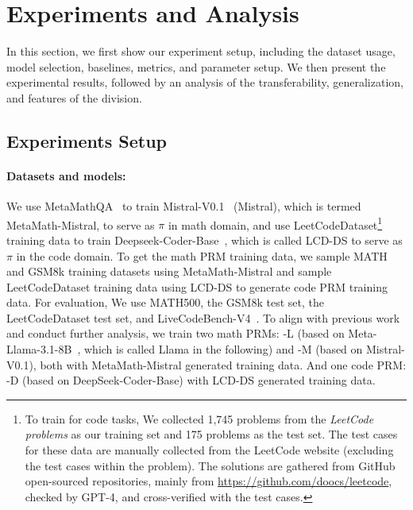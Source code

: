 
\section{Experiments and Analysis}



In this section, we first show our experiment setup, including the dataset usage, model selection, baselines, metrics, and parameter setup.  We then present the experimental results, followed by an analysis of the transferability, generalization, and features of the division.

\subsection{Experiments Setup}

\paragraph{Datasets and models:} We use MetaMathQA~\cite{yu2023metamath} to train Mistral-V0.1~\cite{jiang2023mistral7b} (Mistral), which is termed MetaMath-Mistral, to serve as $\pi$ in math domain, and use LeetCodeDataset\footnote{To train \MethodName \hspace{1pt} for code tasks, We collected 1,745 problems from the \textit{LeetCode problems} as our training set and 175 problems as the test set. The test cases for these data are manually collected from the LeetCode website (excluding the test cases within the problem). 
The solutions are gathered from GitHub open-sourced repositories, mainly from \href{https://github.com/doocs/leetcode}{https://github.com/doocs/leetcode}, checked by GPT-4, and cross-verified with the test cases.} training data to train Deepseek-Coder-Base~\cite{deepseek-coder}, which is called LCD-DS to serve as $\pi$ in the code domain. To get the math PRM training data, we sample MATH and GSM8k training datasets using MetaMath-Mistral and sample LeetCodeDataset training data using LCD-DS to generate code PRM training data. For evaluation, We use MATH500, the GSM8k test set, the LeetCodeDataset test set, and LiveCodeBench-V4~\cite{jain2024livecodebench}. To align with previous work and conduct further analysis, we train two math PRMs: \MethodName-L (based on Meta-Llama-3.1-8B~\cite{grattafiori2024llama3herdmodels}, which is called Llama in the following) and \MethodName-M (based on Mistral-V0.1), both with MetaMath-Mistral generated training data. And one code PRM: \MethodName-D (based on DeepSeek-Coder-Base) with LCD-DS generated training data.





